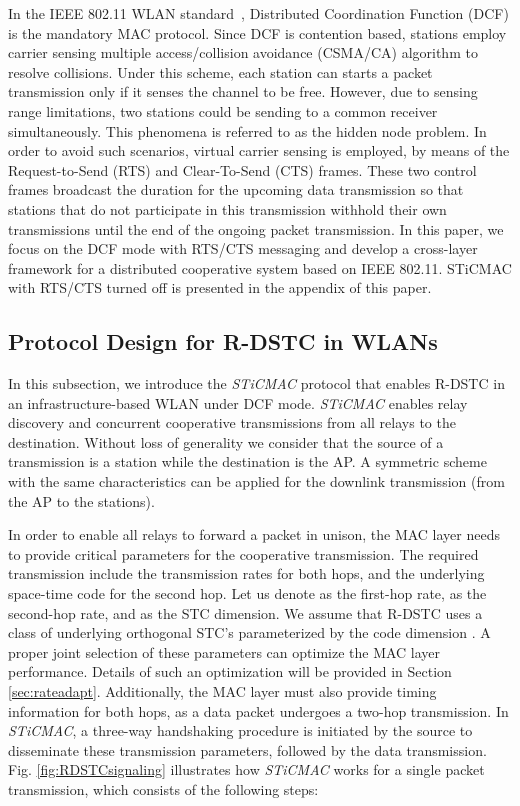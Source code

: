 \documentclass[peerreview,draftcls,onecolumn,12pt,a4paper]{IEEEtran}
\begin{document}
In the IEEE 802.11 WLAN standard~\cite{80211-2007}, Distributed Coordination Function (DCF) is 
the mandatory MAC protocol. Since DCF is contention based, stations employ carrier sensing multiple
access/collision avoidance (CSMA/CA) algorithm to resolve
collisions. Under this scheme, each station can starts a packet
transmission only if it senses the channel to be free. However, due to sensing range limitations, two stations
could be sending to a common receiver simultaneously. This
phenomena is referred to as the hidden node problem. In order to
avoid such scenarios, virtual carrier sensing is employed, by
means of the Request-to-Send (RTS) and Clear-To-Send (CTS) frames.
These two control frames broadcast the duration for the upcoming
data transmission so that stations that do not participate in this
transmission withhold their own transmissions until the end of the
ongoing packet transmission. In this paper, we focus on the DCF
mode with RTS/CTS messaging and develop a cross-layer framework
for a distributed cooperative system based on IEEE 802.11. STiCMAC with RTS/CTS turned off is presented in the appendix of this paper.

\vspace{-0.15in}
\subsection{Protocol Design for R-DSTC in WLANs}
\label{MAC-R-DSTC}
\vspace{-0.05in}

In this subsection, we introduce the
\emph{STiCMAC} protocol that enables R-DSTC in an
infrastructure-based WLAN under DCF mode. \emph{STiCMAC} enables
relay discovery and concurrent cooperative transmissions from all
relays to the destination. Without loss of generality we consider that the source of a transmission is a
station while the destination is the AP. A symmetric scheme with
the same characteristics can be applied for the downlink
transmission (from the AP to the stations). 


In order to enable all relays to forward a packet in unison, the
 MAC layer needs to provide critical parameters for the cooperative
 transmission. The required transmission include the transmission rates for both
 hops, and the underlying space-time code for the second hop. Let us denote  as the first-hop rate,  as the second-hop rate, and  as the STC dimension.
 We assume that R-DSTC uses a class of underlying orthogonal STC's parameterized by the code dimension . A proper joint selection of these parameters can optimize the MAC layer
 performance. Details of such an optimization will be provided in Section
 \ref{sec:rateadapt}. Additionally, the MAC layer must also provide timing information for both hops, as a data packet undergoes
 a two-hop transmission. In \emph{STiCMAC}, a three-way handshaking procedure is initiated by the source to disseminate these transmission parameters,
  followed by the data transmission. Fig. \ref{fig:RDSTCsignaling} illustrates how \emph{STiCMAC} works for a single packet transmission, which consists of the following steps:
\end{document}
